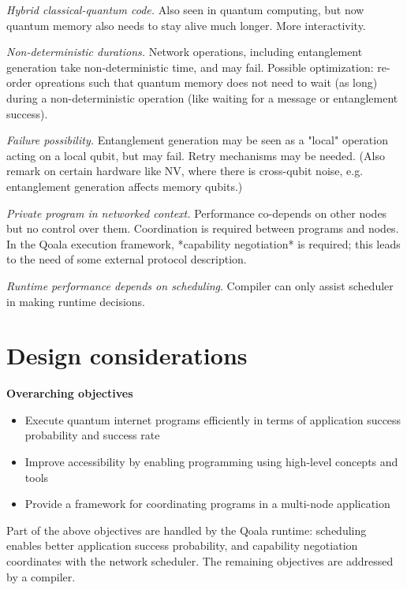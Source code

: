 \textit{Hybrid classical-quantum code.} Also seen in quantum computing, but now quantum memory also needs to stay alive much longer. More interactivity.

\textit{Non-deterministic durations.} Network operations, including entanglement generation take non-deterministic time, and may fail.
Possible optimization: re-order opreations such that quantum memory does not need to wait (as long) during a non-deterministic operation (like waiting for a message or entanglement success).

\textit{Failure possibility.} Entanglement generation may be seen as a "local" operation acting on a local qubit, but may fail. Retry mechanisms may be needed.
(Also remark on certain hardware like NV, where there is cross-qubit noise, e.g. entanglement generation affects memory qubits.)

\textit{Private program in networked context.} Performance co-depends on other nodes but no control over them. Coordination is required between programs and nodes.
In the Qoala execution framework, *capability negotiation* is required; this leads to the need of some external protocol description.

\textit{Runtime performance depends on scheduling}. Compiler can only assist scheduler in making runtime decisions.




\section{Design considerations}

\textbf{Overarching objectives}
\begin{itemize}
\item Execute quantum internet programs efficiently in terms of application success probability and success rate
\item Improve accessibility by enabling programming using high-level concepts and tools
\item Provide a framework for coordinating programs in a multi-node application
\end{itemize}


Part of the above objectives are handled by the Qoala runtime: scheduling enables better application success probability, and capability negotiation coordinates with the network scheduler.
The remaining objectives are addressed by a compiler.

